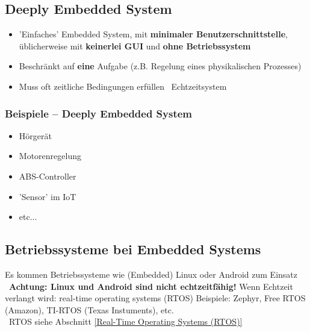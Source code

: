 \subsection{Deeply Embedded System}

\begin{itemize}
    \item 'Einfaches' Embedded System, mit \textbf{minimaler Benutzerschnittstelle}, üblicherweise mit \textbf{keinerlei GUI}
        und \textbf{ohne Betriebssystem}
    \item Beschränkt auf \textbf{eine} Aufgabe (z.B. Regelung eines physikalischen Prozesses)
    \item Muss oft zeitliche Bedingungen erfüllen \textrightarrow\ Echtzeitsystem
\end{itemize}


\subsubsection{Beispiele -- Deeply Embedded System}

\begin{minipage}[t]{0.3\columnwidth}
    \begin{itemize}
        \item Hörgerät
        \item Motorenregelung
    \end{itemize}
\end{minipage}
\hfill
\begin{minipage}[t]{0.3\columnwidth}
    \begin{itemize}
        \item ABS-Controller
        \item 'Sensor' im IoT
    \end{itemize}
\end{minipage}
\hfill
\begin{minipage}[t]{0.3\columnwidth}
    \begin{itemize}
        \item etc...
    \end{itemize}
\end{minipage}


\subsection{Betriebssysteme bei Embedded Systems}

\begin{outline}
    \1 Es kommen Betriebssysteme wie (Embedded) Linux oder Android zum Einsatz \\
        \textrightarrow\ \textbf{Achtung: Linux und Android sind nicht echtzeitfähig!}
    \1 Wenn Echtzeit verlangt wird: real-time operating systems (RTOS)
        \2 Beispiele: Zephyr, Free RTOS (Amazon), TI-RTOS (Texas Instuments), etc. \\
            \textrightarrow\ RTOS siehe Abschnitt \ref{Real-Time Operating Systems (RTOS)}
\end{outline}


